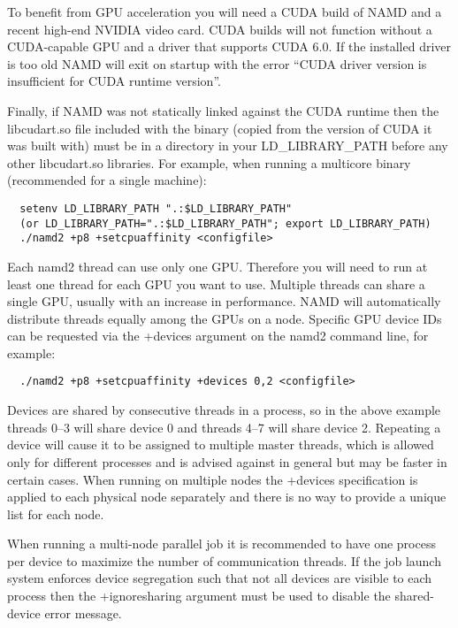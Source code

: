 To benefit from GPU acceleration you will need a CUDA build of NAMD
and a recent high-end NVIDIA video card.  CUDA builds will not function
without a CUDA-capable GPU and a driver that supports CUDA 6.0.  If the
installed driver is too old NAMD will exit on startup with the error
``CUDA driver version is insufficient for CUDA runtime version''.

Finally, if NAMD was not statically linked against the CUDA runtime
then the libcudart.so file included with the binary (copied from
the version of CUDA it was built with) must be in a directory in your
LD\_LIBRARY\_PATH before any other libcudart.so libraries.  For example,
when running a multicore binary (recommended for a single machine):

\begin{verbatim}
  setenv LD_LIBRARY_PATH ".:$LD_LIBRARY_PATH"
  (or LD_LIBRARY_PATH=".:$LD_LIBRARY_PATH"; export LD_LIBRARY_PATH)
  ./namd2 +p8 +setcpuaffinity <configfile>
\end{verbatim}

Each namd2 thread can use only one GPU.  Therefore you will need to run
at least one thread for each GPU you want to use.  Multiple threads
can share a single GPU, usually with an increase in performance.  NAMD
will automatically distribute threads equally among the GPUs on a node.
Specific GPU device IDs can be requested via the +devices argument on
the namd2 command line, for example:

\begin{verbatim}
  ./namd2 +p8 +setcpuaffinity +devices 0,2 <configfile>
\end{verbatim}

Devices are shared by consecutive threads in a process, so in the
above example threads 0--3 will share device 0 and threads 4--7 will
share device 2.  Repeating a device will cause it to be assigned to
multiple master threads, which is allowed only for different processes
and is advised against in general but may be faster in certain cases.
When running on multiple nodes the +devices specification is applied to
each physical node separately and there is no way to provide a unique
list for each node.

When running a multi-node parallel job it is recommended to have one
process per device to maximize the number of communication threads.
If the job launch system enforces device segregation such that not all
devices are visible to each process then the +ignoresharing argument
must be used to disable the shared-device error message.

